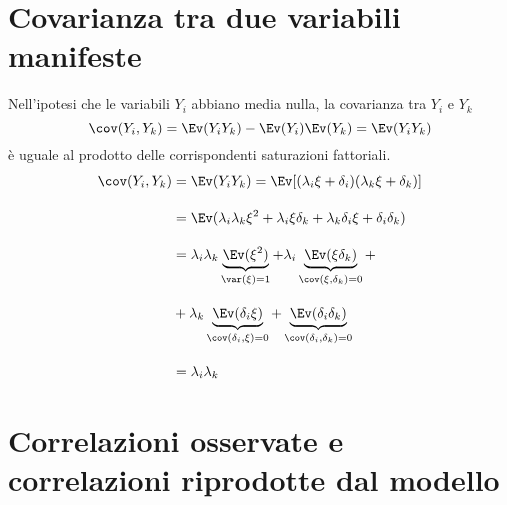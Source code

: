 \section{Covarianza tra due variabili manifeste}

Nell'ipotesi che le variabili $Y_i$ abbiano media nulla, la covarianza
tra $Y_i$ e $Y_k$
$$
\cov(Y_i, Y_k)=\Ev(Y_i Y_k) -
\Ev(Y_i)\Ev(Y_k)=\Ev(Y_i Y_k)
$$ 
è uguale al
prodotto delle corrispondenti saturazioni fattoriali.
\begin{align}
 \cov(Y_i, Y_k) &= \Ev(Y_i Y_k)=\Ev[(\lambda_i \xi + \delta_i)(\lambda_k \xi +  \delta_k)]\notag\\[10pt]
  &=\Ev(\lambda_i\lambda_k\xi^2 + \lambda_i  \xi \delta_k + \lambda_k \delta_i \xi + \delta_i \delta_k)\notag\\[10pt]
&=\lambda_i\lambda_k\underbrace{\Ev(\xi^2)}_{\var(\xi)=1}+\lambda_i\underbrace{\Ev(\xi \delta_k)}_{\cov(\xi, \delta_k) =0}+\notag\\[10pt] \;&+\lambda_k\underbrace{\Ev(\delta_i \xi)}_{\cov(\delta_i, \xi) =0} +\underbrace{\Ev(\delta_i \delta_k)}_{\cov(\delta_i, \delta_k)=0}\notag\\[10pt]
  &=\lambda_i\lambda_k\notag
\end{align}


\section{Correlazioni osservate e correlazioni riprodotte dal modello}

